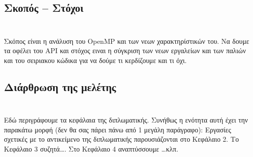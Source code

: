 \newpage
\subsection{Σκοπός – Στόχοι}
\subparagraph{}
{\LARGE {}}\\
Σκόπος είναι η ανάλυση του OpenMP και των νεων χαρακτηρίστικών του. Να δουμε τα οφέλει του API και στόχος 
ειναι η σύγκριση των νεων εργαλείων και των παλιών και του σειριακου κώδικα για να δούμε τι κερδίζουμε και τι όχι.

\subsection{Διάρθρωση της μελέτης}
\subparagraph{}
{\LARGE {}}\\
Εδώ περιγράφουμε τα κεφάλαια της διπλωματικής. Συνήθως η ενότητα αυτή έχει την παρακάτω μορφή (δεν θα σας πάρει πάνω από 1 μεγάλη παράγραφο): Εργασίες σχετικές με το αντικείμενο της διπλωματικής παρουσιάζονται στο Κεφάλαιο 2. Το Κεφάλαιο 3 συζητά…. Στο Κεφάλαιο 4 αναπτύσσουμε …κλπ.

